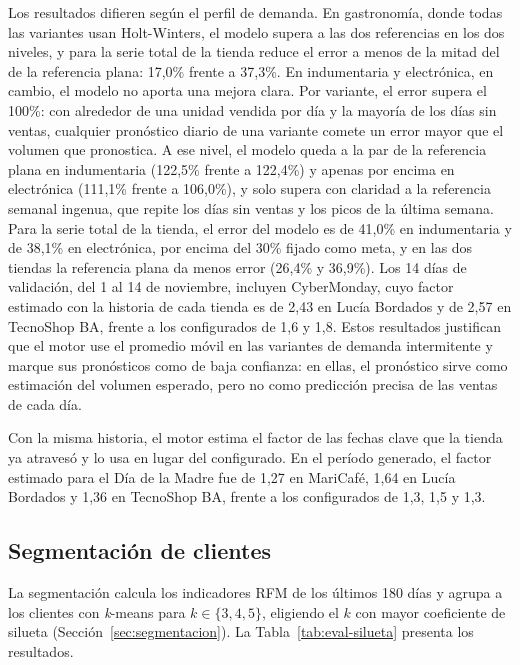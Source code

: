 Los resultados difieren según el perfil de demanda. En gastronomía, donde todas las variantes usan Holt-Winters, el modelo supera a las dos referencias en los dos niveles, y para la serie total de la tienda reduce el error a menos de la mitad del de la referencia plana: 17,0\% frente a 37,3\%. En indumentaria y electrónica, en cambio, el modelo no aporta una mejora clara. Por variante, el error supera el 100\%: con alrededor de una unidad vendida por día y la mayoría de los días sin ventas, cualquier pronóstico diario de una variante comete un error mayor que el volumen que pronostica. A ese nivel, el modelo queda a la par de la referencia plana en indumentaria (122,5\% frente a 122,4\%) y apenas por encima en electrónica (111,1\% frente a 106,0\%), y solo supera con claridad a la referencia semanal ingenua, que repite los días sin ventas y los picos de la última semana. Para la serie total de la tienda, el error del modelo es de 41,0\% en indumentaria y de 38,1\% en electrónica, por encima del 30\% fijado como meta, y en las dos tiendas la referencia plana da menos error (26,4\% y 36,9\%). Los 14 días de validación, del 1 al 14 de noviembre, incluyen CyberMonday, cuyo factor estimado con la historia de cada tienda es de 2,43 en Lucía Bordados y de 2,57 en TecnoShop BA, frente a los configurados de 1,6 y 1,8. Estos resultados justifican que el motor use el promedio móvil en las variantes de demanda intermitente y marque sus pronósticos como de baja confianza: en ellas, el pronóstico sirve como estimación del volumen esperado, pero no como predicción precisa de las ventas de cada día.

Con la misma historia, el motor estima el factor de las fechas clave que la tienda ya atravesó y lo usa en lugar del configurado. En el período generado, el factor estimado para el Día de la Madre fue de 1,27 en MariCafé, 1,64 en Lucía Bordados y 1,36 en TecnoShop BA, frente a los configurados de 1,3, 1,5 y 1,3.

\subsection{Segmentación de clientes}
\label{sec:eval-segmentacion}

La segmentación calcula los indicadores RFM de los últimos 180 días y agrupa a los clientes con \emph{k}-means para $k \in \{3, 4, 5\}$, eligiendo el $k$ con mayor coeficiente de silueta \parencite{Rousseeuw1987} (Sección~\ref{sec:segmentacion}). La Tabla~\ref{tab:eval-silueta} presenta los resultados.

